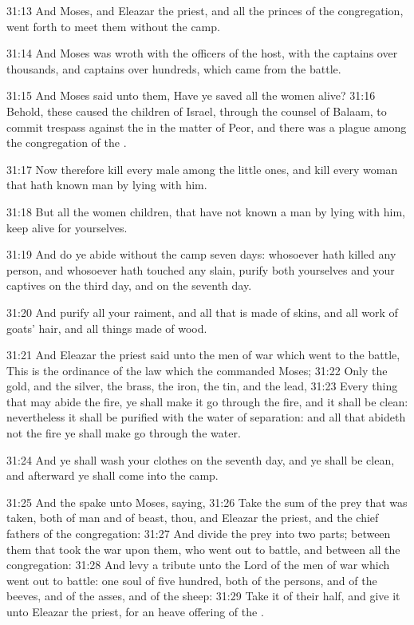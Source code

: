 31:13 And Moses, and Eleazar the priest, and all the princes of the
congregation, went forth to meet them without the camp.

31:14 And Moses was wroth with the officers of the host, with the
captains over thousands, and captains over hundreds, which came from
the battle.

31:15 And Moses said unto them, Have ye saved all the women alive?
31:16 Behold, these caused the children of Israel, through the counsel
of Balaam, to commit trespass against the \LORD in the matter of Peor,
and there was a plague among the congregation of the \LORD.

31:17 Now therefore kill every male among the little ones, and kill
every woman that hath known man by lying with him.

31:18 But all the women children, that have not known a man by lying
with him, keep alive for yourselves.

31:19 And do ye abide without the camp seven days: whosoever hath
killed any person, and whosoever hath touched any slain, purify both
yourselves and your captives on the third day, and on the seventh day.

31:20 And purify all your raiment, and all that is made of skins, and
all work of goats' hair, and all things made of wood.

31:21 And Eleazar the priest said unto the men of war which went to
the battle, This is the ordinance of the law which the \LORD commanded
Moses; 31:22 Only the gold, and the silver, the brass, the iron, the
tin, and the lead, 31:23 Every thing that may abide the fire, ye shall
make it go through the fire, and it shall be clean: nevertheless it
shall be purified with the water of separation: and all that abideth
not the fire ye shall make go through the water.

31:24 And ye shall wash your clothes on the seventh day, and ye shall
be clean, and afterward ye shall come into the camp.

31:25 And the \LORD spake unto Moses, saying, 31:26 Take the sum of the
prey that was taken, both of man and of beast, thou, and Eleazar the
priest, and the chief fathers of the congregation: 31:27 And divide
the prey into two parts; between them that took the war upon them, who
went out to battle, and between all the congregation: 31:28 And levy a
tribute unto the Lord of the men of war which went out to battle: one
soul of five hundred, both of the persons, and of the beeves, and of
the asses, and of the sheep: 31:29 Take it of their half, and give it
unto Eleazar the priest, for an heave offering of the \LORD.

